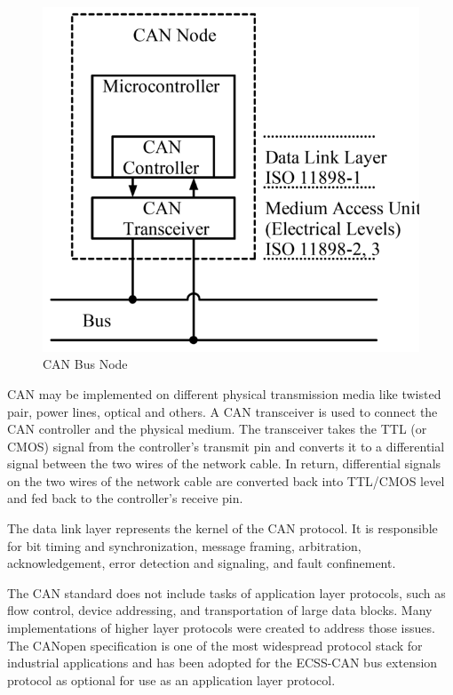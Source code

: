 \begin{figure}[h]
\centering\includegraphics[scale=0.3]{fig/can_bus_node}
\caption{CAN Bus Node}
\label{fig:CAN Bus Node}
\end{figure}

CAN may be implemented on different physical transmission media like twisted pair, power lines, optical and others. A CAN transceiver is used to connect the CAN controller and the physical medium. The transceiver takes the TTL (or CMOS) signal from the controller’s transmit pin and converts it to a differential signal between the two wires of the network cable. In return, differential signals on the two wires of the network cable are converted back into TTL/CMOS level and fed back to the controller’s receive pin.

The data link layer represents the kernel of the CAN protocol. It is responsible for bit timing and synchronization, message framing, arbitration, acknowledgement, error detection and signaling, and fault confinement.

The CAN standard does not include tasks of application layer protocols, such
as flow control, device addressing, and transportation of large data blocks. Many
implementations of higher layer protocols were created to address those issues. The CANopen specification is one of the most widespread protocol stack for industrial applications and has been adopted for the ECSS-CAN bus extension protocol as optional for use as an application layer protocol. 

